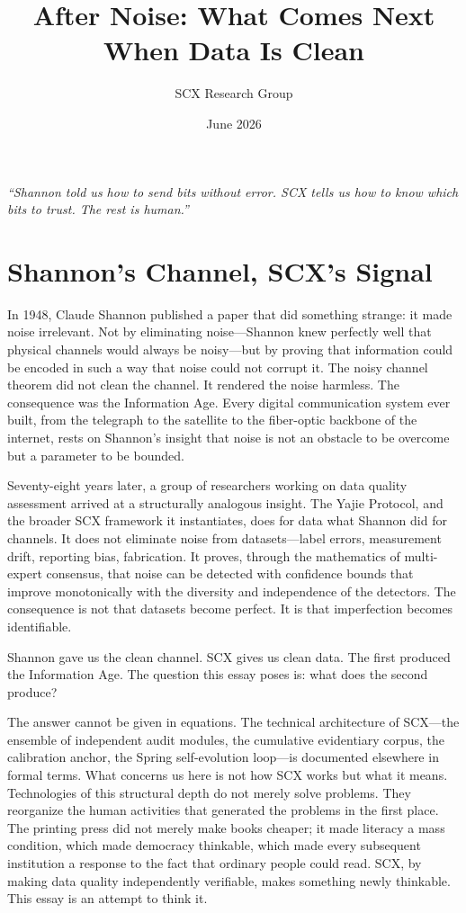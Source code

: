 \documentclass[12pt,a4paper]{article}
\title{After Noise: What Comes Next When Data Is Clean}
\author{SCX Research Group}
\date{June 2026}
\begin{document}
\maketitle

\begin{center}
\itshape
``Shannon told us how to send bits without error. SCX tells us how to know which bits to trust. The rest is human.''
\end{center}

\bigskip

\section{Shannon's Channel, SCX's Signal}

In 1948, Claude Shannon published a paper that did something strange: it made noise irrelevant. Not by eliminating noise---Shannon knew perfectly well that physical channels would always be noisy---but by proving that information could be encoded in such a way that noise could not corrupt it. The noisy channel theorem did not clean the channel. It rendered the noise harmless. The consequence was the Information Age. Every digital communication system ever built, from the telegraph to the satellite to the fiber-optic backbone of the internet, rests on Shannon's insight that noise is not an obstacle to be overcome but a parameter to be bounded.

Seventy-eight years later, a group of researchers working on data quality assessment arrived at a structurally analogous insight. The Yajie Protocol, and the broader SCX framework it instantiates, does for data what Shannon did for channels. It does not eliminate noise from datasets---label errors, measurement drift, reporting bias, fabrication. It proves, through the mathematics of multi-expert consensus, that noise can be detected with confidence bounds that improve monotonically with the diversity and independence of the detectors. The consequence is not that datasets become perfect. It is that imperfection becomes identifiable.

Shannon gave us the clean channel. SCX gives us clean data. The first produced the Information Age. The question this essay poses is: what does the second produce?

The answer cannot be given in equations. The technical architecture of SCX---the ensemble of independent audit modules, the cumulative evidentiary corpus, the calibration anchor, the Spring self-evolution loop---is documented elsewhere in formal terms. What concerns us here is not how SCX works but what it means. Technologies of this structural depth do not merely solve problems. They reorganize the human activities that generated the problems in the first place. The printing press did not merely make books cheaper; it made literacy a mass condition, which made democracy thinkable, which made every subsequent institution a response to the fact that ordinary people could read. SCX, by making data quality independently verifiable, makes something newly thinkable. This essay is an attempt to think it.
\end{document}
